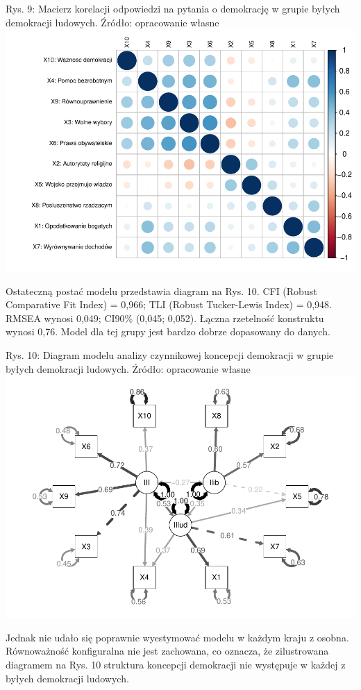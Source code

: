 \documentclass[12pt]{article}
\begin{document}
Rys. 9: Macierz korelacji odpowiedzi na pytania o demokrację w grupie byłych demokracji ludowych. Źródło: opracowanie własne
\includegraphics{text_ASA_files/figure-latex/cor-matrix-east-1.pdf}

Ostateczną postać modelu przedstawia diagram na Rys. 10. CFI (Robust Comparative Fit Index) = 0,966; TLI (Robust Tucker-Lewis Index) = 0,948. RMSEA wynosi 0,049; CI90\% (0,045; 0,052). Łączna rzetelność konstruktu wynosi 0,76. Model dla tej grupy jest bardzo dobrze dopasowany do danych.

Rys. 10: Diagram modelu analizy czynnikowej koncepcji demokracji w grupie byłych demokracji ludowych. Źródło: opracowanie własne
\includegraphics{text_ASA_files/figure-latex/diagram-east-1.pdf}

Jednak nie udało się poprawnie wyestymować modelu w każdym kraju z osobna. Równoważność konfiguralna nie jest zachowana, co oznacza, że zilustrowana diagramem na Rys. 10 struktura koncepcji demokracji nie występuje w każdej z byłych demokracji ludowych.
\end{document}
